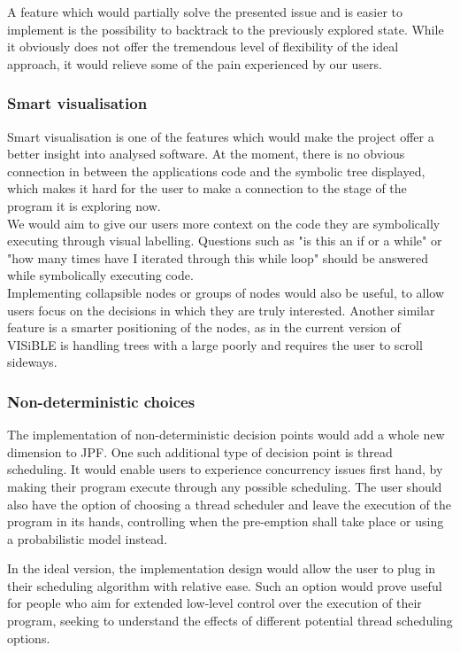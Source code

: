\documentclass[titlepage,11pt]{article}
\begin{document}
\noindent A feature which would partially solve the presented issue and is easier to implement is the possibility to backtrack to the previously explored state. While it obviously does not offer the tremendous level of flexibility of the ideal approach, it would relieve some of the pain experienced by our users.

\subsubsection{Smart visualisation}

Smart visualisation is one of the features which would make the project offer a better insight into analysed software. At the moment, there is no obvious connection in between the applications code and the symbolic tree displayed, which makes it hard for the user to make a connection to the stage of the program it is exploring now. \\

We would aim to give our users more context on the code they are symbolically executing through visual labelling. Questions such as "is this an if or a while" or "how many times have I iterated through this while loop" should be answered while symbolically executing code. \\

Implementing collapsible nodes or groups of nodes would also be useful, to allow users focus on the decisions in which they are truly interested. Another similar feature is a smarter positioning of the nodes, as in the current version of VISiBLE is handling trees with a large poorly and requires the user to scroll sideways.

\subsubsection{Non-deterministic choices}

The implementation of non-deterministic decision points would add a whole new dimension to JPF. One such additional type of decision point is thread scheduling. It would enable users to experience concurrency issues first hand, by making their program execute through any possible scheduling. The user should also have the option of choosing a thread scheduler and leave the execution of the program in its hands, controlling when the pre-emption shall take place or using a probabilistic model instead.

In the ideal version, the implementation design would allow the user to plug in their scheduling algorithm with relative ease. Such an option would prove useful for people who aim for extended low-level control over the execution of their program, seeking to understand the effects of different potential thread scheduling options.
\end{document}

